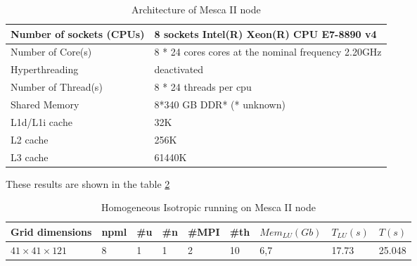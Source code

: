 \begin{table}[!h]
\centering
\begin{tabular}{|l|l|}
\hline
Number of sockets (CPUs) & 8 sockets Intel(R) Xeon(R) CPU E7-8890 v4 	\\	
\hline
Number of Core(s) & 8 * 24 cores cores at the nominal frequency 2.20GHz	\\	
\hline
Hyperthreading & deactivated			\\
\hline
Number of Thread(s) &  8 * 24 threads per cpu	\\
\hline
Shared Memory & 8*340 GB DDR*  (* unknown)   \\	
\hline		
L1d/L1i cache &         32K	\\		
\hline
L2 cache &              256K	\\	
\hline	
L3 cache &              61440K	\\
\hline
\end{tabular}
\caption{Architecture of Mesca II node}
\label{mescaNode}
\end{table}

These results are shown in the table \ref{Mesca1}

\begin{table}[!h]
\centering

\begin{tabular}{lllllllll}
Grid dimensions & npml & \#u & \#n & \#MPI & \#th & $Mem_{LU}(Gb)$ & $T_{LU}(s)$ & $T(s)$ \\
 \hline
$41 \times 41 \times 121$ & 8 & 1 & 1 & 2  & 10 & 6,7 &  17.73 & 25.048 
\end{tabular}
\caption{Homogeneous Isotropic running on Mesca II node}
\label{Mesca1}
\end{table}


